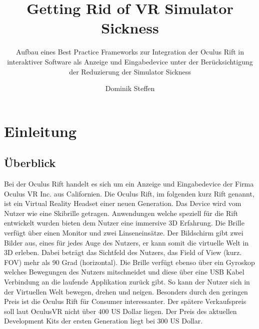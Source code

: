 \documentclass[pagesize, paper=a4, fontsize=12pt,titlepage=true, headings=small, headnosepline, abstractoff, liststotoc, nochapterprefix, plainheadsepline]{scrreprt}
\author{
Dominik Steffen
}
\title{Getting Rid of VR Simulator Sickness}
\subtitle{Aufbau eines Best Practice Frameworks zur Integration der Oculus Rift in interaktiver Software als Anzeige und Eingabedevice unter der Berücksichtigung der Reduzierung der Simulator Sickness}
\begin{document}
\maketitle
%

\mbox{}

\begingroup
	\clearpage
	\pagestyle{empty}
	\tableofcontents
	\clearpage
\endgroup
\thispagestyle{empty}
\mbox{}


\renewcommand*{\chapterpagestyle}{plain}
\pagestyle{plain}
\setcounter{page}{0}

\chapter{Einleitung}

\section{Überblick}
Bei der Oculus Rift handelt es sich um ein Anzeige und Eingabedevice der Firma Oculus VR Inc. aus Californien. Die Oculus Rift, im folgenden kurz Rift genannt, ist ein Virtual Reality Headset einer neuen Generation. Das Device wird vom Nutzer wie eine Skibrille getragen. Anwendungen welche speziell für die Rift entwickelt wurden bieten dem Nutzer eine immersive 3D Erfahrung. Die Brille verfügt über einen Monitor und zwei Linseneinsätze. Der Bildschirm gibt zwei Bilder aus, eines für jedes Auge des Nutzers, er kann somit die virtuelle Welt in 3D erleben. Dabei beträgt das Sichtfeld des Nutzers, das Field of View (kurz. FOV) mehr als 90 Grad (horizontal). Die Brille verfügt ebenso über ein Gyroskop welches Bewegungen des Nutzers mitschneidet und diese über eine USB Kabel Verbindung an die laufende Applikation zurück gibt. So kann der Nutzer sich in der Virtuellen Welt bewegen, drehen und neigen. Besonders durch den geringen Preis ist die Oculus Rift für Consumer interessanter. Der spätere Verkaufspreis soll laut OculusVR nicht über 400 US Dollar liegen. Der Preis des aktuellen Development Kits der ersten Generation liegt bei 300 US Dollar.
\end{document}
